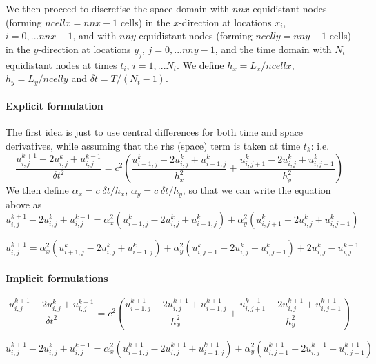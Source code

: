 We then proceed to discretise the space domain with $nnx$ equidistant nodes (forming $ncellx=nnx-1$ cells) in the $x$-direction at locations $x_i$, $i=0,...nnx-1$,  
and with $nny$ equidistant nodes (forming $ncelly=nny-1$ cells) in the $y$-direction 
at locations $y_j$, $j=0,...nny-1$,
and the time domain with $N_t$ equidistant nodes at times
$t_i$, $i=1,...N_t$.
We define $h_x=L_x/ncellx$, $h_y=L_y/ncelly$ and $\delta\! t=T/(N_t-1)$.



\paragraph{Explicit formulation}

The first idea is just to use central differences for both time and space derivatives,
while assuming that the rhs (space) term is taken at time $t_k$:
i.e.
\[
\frac{ u_{i,j}^{k+1} -2u_{i,j}^{k} +u_{i,j}^{k-1}  }{\delta\! t^2} = 
c^2
\left(
\frac{ u_{i+1,j}^k -2u_{i,j}^k +u_{i-1,j}^k  }{h_x^2} 
+
\frac{ u_{i,j+1}^k -2u_{i,j}^k +u_{i,j-1}^k  }{h_y^2} 
\right)
\]
We then define $\alpha_x = c\; \delta\! t / h_x$,
$\alpha_y = c\; \delta\! t / h_y$, so that we can write the equation above as
\begin{equation}
u_{i,j}^{k+1} -2u_{i,j}^{k} +u_{i,j}^{k-1}  
= 
\alpha_x^2 (u_{i+1,j}^k -2u_{i,j}^k +u_{i-1,j}^k )
+
\alpha_y^2 (u_{i,j+1}^k -2u_{i,j}^k +u_{i,j-1}^k )
\label{eq:fdmwave1}
\end{equation}

\begin{mdframed}[backgroundcolor=blue!5]
\[
u_{i,j}^{k+1}
= \alpha_x^2 (u_{i+1,j}^k -2u_{i,j}^k +u_{i-1,j}^k )
+
\alpha_y^2 (u_{i,j+1}^k -2u_{i,j}^k +u_{i,j-1}^k )
+2u_{i,j}^{k} -u_{i,j}^{k-1}
\]
\end{mdframed}



\paragraph{Implicit formulations}

\[
\frac{ u_{i,j}^{k+1} -2u_{i,j}^{k} +u_{i,j}^{k-1}  }{\delta\! t^2} = 
c^2
\left(
\frac{ u_{i+1,j}^{k+1} -2u_{i,j}^{k+1} +u_{i-1,j}^{k+1}  }{h_x^2} 
+
\frac{ u_{i,j+1}^{k+1} -2u_{i,j}^{k+1} +u_{i,j-1}^{k+1}  }{h_y^2} 
\right)
\]

\[
u_{i,j}^{k+1} -2u_{i,j}^{k} +u_{i,j}^{k-1}  
=
\alpha_x^2 (u_{i+1,j}^{k+1} -2u_{i,j}^{k+1} +u_{i-1,j}^{k+1} )
+
\alpha_y^2 (u_{i,j+1}^{k+1} -2u_{i,j}^{k+1} +u_{i,j-1}^{k+1} )
\]

